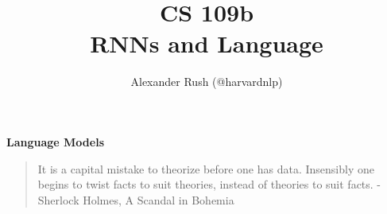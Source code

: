 \documentclass{beamer}
\title[Seq2seq]{CS 109b \\   RNNs and Language }
\author[Alexander Rush]{Alexander Rush  (@harvardnlp) \\  
}
\date{}
\begin{document}
\begin{frame}
  \titlepage
\end{frame}

\begin{frame}
  \begin{center}
    \textbf{Language Models}
  \end{center}
\end{frame}

\begin{frame}
  \begin{quote}
    It is a capital mistake to theorize before one has
    data. Insensibly one begins to twist facts to suit theories,
    instead of theories to suit facts. -Sherlock Holmes, A Scandal in Bohemia
  \end{quote}


\end{frame}
\end{document}
